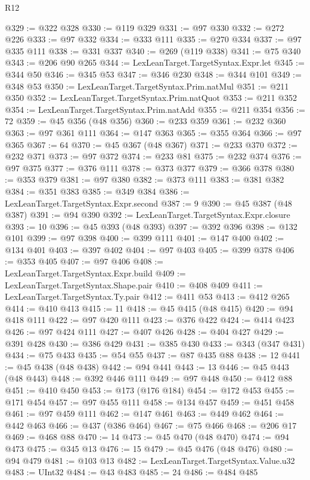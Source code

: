 \begin{lexlean}{R12}
\begin{coremodule}
@329 := @322 @328
@330 := @119 @329
@331 := @97 @330
@332 := @272 @226
@333 := @97 @332
@334 := @333 @111
@335 := @270 @334
@337 := @97 @335 @111
@338 := @331 @337
@340 := @269 (@119 @338)
@341 := @75 @340
@343 := @206 @90 @265
@344 := LexLeanTarget.TargetSyntax.Expr.let
@345 := @344 @50
@346 := @345 @53
@347 := @346 @230
@348 := @344 @101
@349 := @348 @53
@350 := LexLeanTarget.TargetSyntax.Prim.natMul
@351 := @211 @350
@352 := LexLeanTarget.TargetSyntax.Prim.natQuot
@353 := @211 @352
@354 := LexLeanTarget.TargetSyntax.Prim.natAdd
@355 := @211 @354
@356 := 72
@359 := @45 @356 (@48 @356)
@360 := @233 @359
@361 := @232 @360
@363 := @97 @361 @111
@364 := @147 @363
@365 := @355 @364
@366 := @97 @365
@367 := 64
@370 := @45 @367 (@48 @367)
@371 := @233 @370
@372 := @232 @371
@373 := @97 @372
@374 := @233 @81
@375 := @232 @374
@376 := @97 @375
@377 := @376 @111
@378 := @373 @377
@379 := @366 @378
@380 := @353 @379
@381 := @97 @380
@382 := @373 @111
@383 := @381 @382
@384 := @351 @383
@385 := @349 @384
@386 := LexLeanTarget.TargetSyntax.Expr.second
@387 := 9
@390 := @45 @387 (@48 @387)
@391 := @94 @390
@392 := LexLeanTarget.TargetSyntax.Expr.closure
@393 := 10
@396 := @45 @393 (@48 @393)
@397 := @392 @396
@398 := @132 @101
@399 := @97 @398
@400 := @399 @111
@401 := @147 @400
@402 := @134 @401
@403 := @397 @402
@404 := @97 @403
@405 := @399 @378
@406 := @353 @405
@407 := @97 @406
@408 := LexLeanTarget.TargetSyntax.Expr.build
@409 := LexLeanTarget.TargetSyntax.Shape.pair
@410 := @408 @409
@411 := LexLeanTarget.TargetSyntax.Ty.pair
@412 := @411 @53
@413 := @412 @265
@414 := @410 @413
@415 := 11
@418 := @45 @415 (@48 @415)
@420 := @94 @418 @111
@422 := @97 @420 @111
@423 := @376 @422
@424 := @414 @423
@426 := @97 @424 @111
@427 := @407 @426
@428 := @404 @427
@429 := @391 @428
@430 := @386 @429
@431 := @385 @430
@433 := @343 (@347 @431)
@434 := @75 @433
@435 := @54 @55
@437 := @87 @435 @88
@438 := 12
@441 := @45 @438 (@48 @438)
@442 := @94 @441
@443 := 13
@446 := @45 @443 (@48 @443)
@448 := @392 @446 @111
@449 := @97 @448
@450 := @412 @88
@451 := @410 @450
@453 := @173 (@176 @184)
@454 := @172 @453
@455 := @171 @454
@457 := @97 @455 @111
@458 := @134 @457
@459 := @451 @458
@461 := @97 @459 @111
@462 := @147 @461
@463 := @449 @462
@464 := @442 @463
@466 := @437 (@386 @464)
@467 := @75 @466
@468 := @206 @17
@469 := @468 @88
@470 := 14
@473 := @45 @470 (@48 @470)
@474 := @94 @473
@475 := @345 @13
@476 := 15
@479 := @45 @476 (@48 @476)
@480 := @94 @479
@481 := @103 @13
@482 := LexLeanTarget.TargetSyntax.Value.u32
@483 := UInt32
@484 := @43 @483
@485 := 24
@486 := @484 @485

\end{coremodule}
\end{lexlean}
